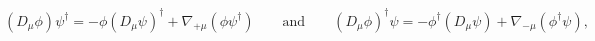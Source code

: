 \begin{equation}\label{ti}
 (D_\mu\phi)\psi^\dagger=-\phi(D_\mu\psi)^\dagger+
   \nabla_{+\mu}(\phi\psi^\dagger)
 \qquad\text{and}\qquad
 (D_\mu\phi)^\dagger\psi=-\phi^\dagger(D_\mu\psi)+
 \nabla_{-\mu}(\phi^\dagger\psi),
\end{equation}

